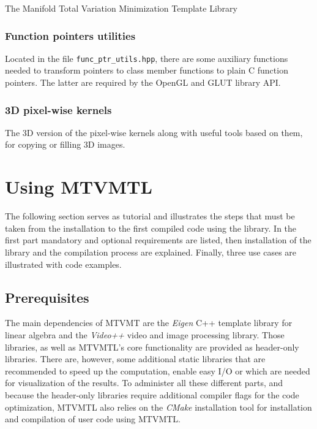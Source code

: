 \begin{chapter}{The Manifold Total Variation Minimization Template Library}

\subsubsection{Function pointers utilities} %
\label{ssub:Function pointers}
Located in the file \texttt{func\_ptr\_utils.hpp}, there are some auxiliary functions needed to transform pointers to class member functions
to plain C function pointers. The latter are required by the OpenGL and GLUT library API.

\subsubsection{3D pixel-wise kernels} %
\label{ssub:3D pixel-wise kernels}
The 3D version of the pixel-wise kernels along with useful tools based on them, for copying or filling 3D images.



\section{Using MTVMTL} %
\label{sec:Using TVTML}
The following section serves as tutorial and illustrates the steps that must be taken
from the installation to the first compiled code using the library. In the first part
mandatory and optional requirements are listed, then installation of the library and
the compilation process are explained. Finally, three use cases are illustrated with
code examples.

\subsection{Prerequisites} %
\label{sub:Prerequisites}
The main dependencies of MTVMT are the \textit{Eigen} C++ template library for linear algebra and the \textit{Video++} video and image processing library. 
Those libraries, as well as MTVMTL's core functionality are provided as header-only libraries. There are, however, some additional static libraries
that are recommended to speed up the computation, enable easy I/O or which are needed for visualization of the results.
To administer all these different parts, and because the header-only libraries require additional compiler flags for the code optimization, MTVMTL also relies
on the \textit{CMake} installation tool for installation and compilation of user code using MTVMTL. \\


\end{chapter}
